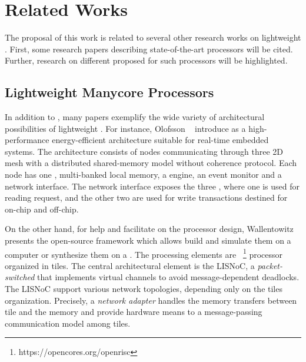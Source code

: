 \chapter{Related Works}
\label{ch.related-works}

The proposal of this work is related to several other research works
on lightweight \manycores.
First, some research papers describing state-of-the-art \manycores
processors will be cited. Further, research on different \oses
proposed for such processors will be highlighted.

\section{Lightweight Manycore Processors}

	In addition to \mppa, many papers exemplify the wide variety of architectural
	possibilities of lightweight \manycores.
	For instance, Olofsson \etal~\cite{olofsson2014} introduce \epiphany as a
	high-performance energy-efficient \manycore architecture suitable for
	real-time embedded systems.
	The architecture consists of nodes communicating through three 2D mesh \nocs
	with a distributed shared-memory model without coherence protocol.
	Each node has one \risc \cpu, multi-banked local memory, a \dma engine,
	an event monitor and a network interface.
	The network interface exposes the three \nocs, where one is used for reading
	request, and the other two are used for write transactions destined for on-chip
	and off-chip.


	On the other hand, for help and facilitate on the \manycore processor design,
	Wallentowitz \etal~\cite{Wallentowitz2013} presents the open-source framework
	\optimsoc which allows build \manycore \soc and simulate them on a computer or
	synthesize them on a \fpga.
	The processing elements are \openrisc~\footnote{https://opencores.org/openrisc}
	processor organized in tiles.
	The central architectural element is the LISNoC, a \textit{packet-switched \noc}
	that implements virtual channels to avoid message-dependent deadlocks.
	The LISNoC support various network topologies, depending only on the tiles organization.
	Precisely, a \textit{network adapter} handles the memory transfers between
	tile and the memory and provide hardware means to a message-passing communication
	model among tiles.


